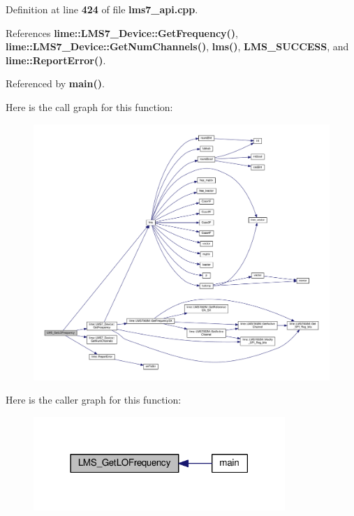 Definition at line {\bf 424} of file {\bf lms7\+\_\+api.\+cpp}.



References {\bf lime\+::\+L\+M\+S7\+\_\+\+Device\+::\+Get\+Frequency()}, {\bf lime\+::\+L\+M\+S7\+\_\+\+Device\+::\+Get\+Num\+Channels()}, {\bf lms()}, {\bf L\+M\+S\+\_\+\+S\+U\+C\+C\+E\+SS}, and {\bf lime\+::\+Report\+Error()}.



Referenced by {\bf main()}.



Here is the call graph for this function\+:
\nopagebreak
\begin{figure}[H]
\begin{center}
\leavevmode
\includegraphics[width=350pt]{df/de1/lms7__api_8cpp_a0abde7a7cb9049f96c3d33de71eabd2a_cgraph}
\end{center}
\end{figure}




Here is the caller graph for this function\+:
\nopagebreak
\begin{figure}[H]
\begin{center}
\leavevmode
\includegraphics[width=270pt]{df/de1/lms7__api_8cpp_a0abde7a7cb9049f96c3d33de71eabd2a_icgraph}
\end{center}
\end{figure}


